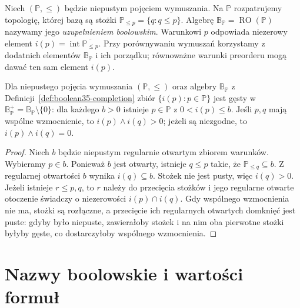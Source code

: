 \begin{definicja}
\label{def:boolean35-completion}
Niech $(\mathbb P,\leq)$ będzie niepustym
pojęciem wymuszania. Na $\mathbb P$
rozpatrujemy topologię, której bazą są
stożki $\mathbb P_{\le p}=\{q:q\le p\}$.
Algebrę
$\mathbb B_{\mathbb P}=\operatorname{RO}(\mathbb P)$
nazywamy jego \emph{uzupełnieniem boolowskim}.
Warunkowi $p$ odpowiada niezerowy element
$i(p)=\operatorname{int}\overline{\mathbb P_{\le p}}$.
Przy porównywaniu wymuszań korzystamy z
dodatnich elementów $\mathbb B_{\mathbb P}$
i ich porządku; równoważne warunki
preorderu mogą dawać ten sam element $i(p)$.
\end{definicja}

\begin{lemat}
\label{lem:boolean35-dense-completion}
Dla niepustego pojęcia wymuszania
$(\mathbb P,\leq)$ oraz algebry
$\mathbb B_{\mathbb P}$ z
Definicji~\ref{def:boolean35-completion}
zbiór $\{i(p):p\in\mathbb P\}$
jest gęsty w $\mathbb B_{\mathbb P}^+
=\mathbb B_{\mathbb P}\setminus\{0\}$:
dla każdego $b>0$ istnieje
$p\in\mathbb P$ z $0<i(p)\le b$.
Jeśli $p,q$ mają wspólne wzmocnienie,
to $i(p)\wedge i(q)>0$; jeżeli są niezgodne,
to $i(p)\wedge i(q)=0$.
\end{lemat}
\begin{proof}
Niech $b$ będzie niepustym regularnie
otwartym zbiorem warunków. Wybieramy
$p\in b$. Ponieważ $b$ jest otwarty,
istnieje $q\le p$ takie, że
$\mathbb P_{\le q}\subseteq b$.
Z regularnej otwartości $b$ wynika
$i(q)\subseteq b$. Stożek nie jest pusty,
więc $i(q)>0$. Jeżeli istnieje
$r\le p,q$, to $r$ należy do przecięcia
stożków i jego regularne otwarte
otoczenie świadczy o niezerowości
$i(p)\cap i(q)$. Gdy wspólnego
wzmocnienia nie ma, stożki są rozłączne,
a przecięcie ich regularnych otwartych
domknięć jest puste: gdyby było
niepuste, zawierałoby stożek i na nim
oba pierwotne stożki byłyby gęste,
co dostarczyłoby wspólnego wzmocnienia.
\end{proof}

\section{Nazwy boolowskie i wartości formuł}

